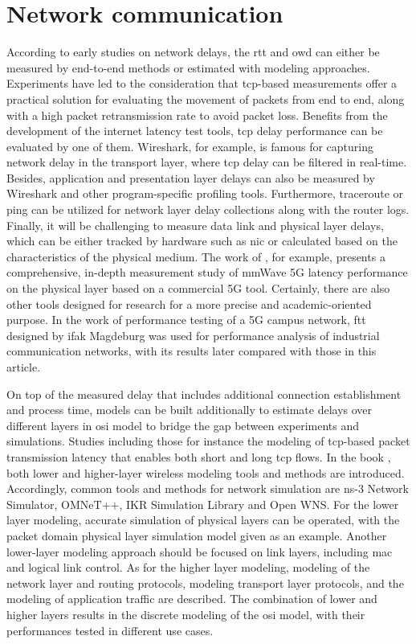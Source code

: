 \section{Network communication}
According to early studies on network delays, the \gls{rtt} and \gls{owd} 
can either be measured by end-to-end methods or estimated with modeling 
approaches. Experiments have led to the consideration that \gls{tcp}-based 
measurements offer a practical solution for evaluating the movement of 
packets from end to end, along with a high packet retransmission rate 
to avoid packet loss\cite{paxson_end--end_1999}. Benefits from 
the development of the internet latency test tools, \gls{tcp} delay 
performance can be evaluated by one of them. Wireshark, for example, is famous 
for capturing network delay in the transport layer, where \gls{tcp} delay 
can be filtered in real-time\cite{dsouza_transmission_2020}. Besides, 
application and presentation layer delays can also be measured by Wireshark and 
other program-specific profiling tools\cite{heger_application_2017}. Furthermore, 
traceroute or ping can be utilized 
for network layer delay collections along with the router logs\cite{Deri2003}. 
Finally, it will be challenging to measure 
data link and physical layer delays, which can be either tracked by hardware 
such as \gls{nic} or calculated based on the characteristics 
of the physical medium. The work of \cite{Fezeu2023}, for example, 
presents a comprehensive, 
in-depth measurement study of mmWave 5G latency performance on the physical layer 
based on a commercial 5G tool.   
Certainly, there are also other tools designed for research for a more 
precise and academic-oriented purpose. In the work of performance testing 
of a 5G campus network, \gls{ftt} designed by ifak Magdeburg was used 
for performance analysis of industrial communication networks\cite{cainelli_performance_2023}, 
with its results later compared with those in this article.


On top of the measured delay 
that includes additional connection establishment and process time, 
models can be built additionally to estimate delays over different layers in 
\gls{osi} model to bridge the gap between experiments and simulations. 
Studies including those for instance the modeling of \gls{tcp}-based 
packet transmission latency that enables both short and 
long \gls{tcp} flows\cite{luan_estimating_2019}. In the book \cite{wehrle2010modeling}, 
both lower and higher-layer wireless modeling tools and methods are introduced. 
Accordingly, common tools and methods for network simulation are ns-3 Network Simulator, OMNeT++, 
IKR Simulation Library and Open WNS. For the lower layer modeling, accurate simulation 
of physical layers can be operated, with the packet domain physical layer simulation 
model given as an example. Another lower-layer modeling approach should be focused on 
link layers, including \gls{mac} and logical link control. As for the higher layer 
modeling, modeling of the network layer and routing protocols, modeling 
transport layer protocols, and the modeling of application traffic are described. 
The combination of lower and higher layers results in the discrete modeling 
of the \gls{osi} model, with their performances tested in different use cases. 




